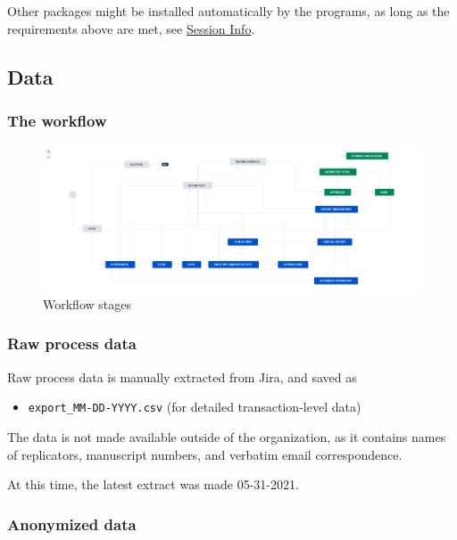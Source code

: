 \documentclass[
]{article}
\providecommand{\tightlist}{%
  \setlength{\itemsep}{0pt}\setlength{\parskip}{0pt}}
\begin{document}
Other packages might be installed automatically by the programs, as long
as the requirements above are met, see
\protect\hyperlink{r-session-info}{Session Info}.

\hypertarget{data}{%
\subsection{Data}\label{data}}

\hypertarget{the-workflow}{%
\subsubsection{The workflow}\label{the-workflow}}

\begin{figure}
\centering
\includegraphics{images/AEADataEditorWorkflow-20191028.png}
\caption{Workflow stages}
\end{figure}

\hypertarget{raw-process-data}{%
\subsubsection{Raw process data}\label{raw-process-data}}

Raw process data is manually extracted from Jira, and saved as

\begin{itemize}
\tightlist
\item
  \texttt{export\_MM-DD-YYYY.csv} (for detailed transaction-level data)
\end{itemize}

The data is not made available outside of the organization, as it
contains names of replicators, manuscript numbers, and verbatim email
correspondence.

At this time, the latest extract was made 05-31-2021.

\hypertarget{anonymized-data}{%
\subsubsection{Anonymized data}\label{anonymized-data}}
\end{document}
